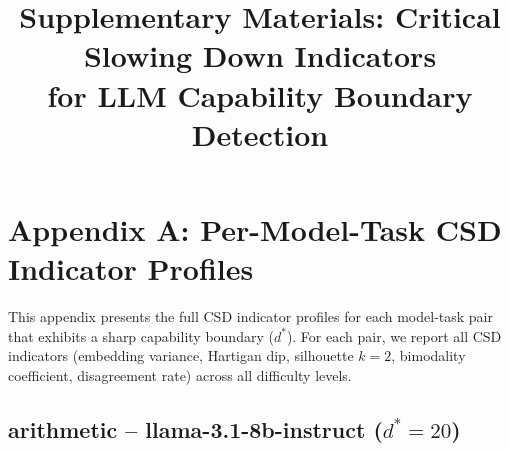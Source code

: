 \documentclass[11pt]{article}
\title{Supplementary Materials: Critical Slowing Down Indicators\\for LLM Capability Boundary Detection}
\author{}
\date{}
\begin{document}
\maketitle

\tableofcontents
\clearpage


\section{Appendix A: Per-Model-Task CSD Indicator Profiles}
\label{app:csd_profiles}

This appendix presents the full CSD indicator profiles for each model-task pair
that exhibits a sharp capability boundary ($d^*$). For each pair, we report
all CSD indicators (embedding variance, Hartigan dip, silhouette $k{=}2$,
bimodality coefficient, disagreement rate) across all difficulty levels.

\subsection{arithmetic -- llama-3.1-8b-instruct ($d^*=20$)}
\end{document}
